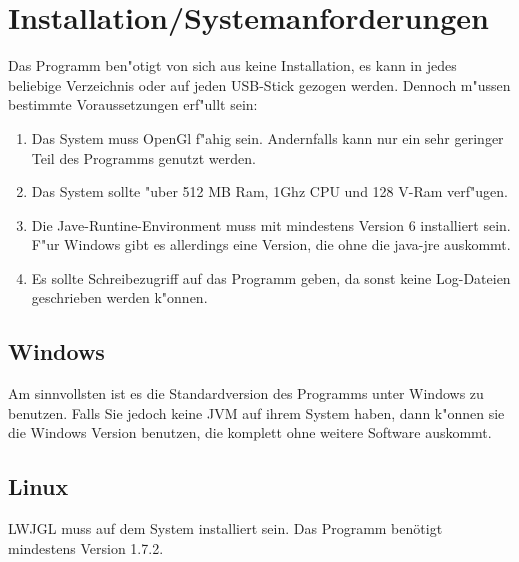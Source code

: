 \documentclass{scrartcl}
\begin{document}
\section {Installation/Systemanforderungen}
Das Programm ben"otigt von sich aus keine Installation, es kann in jedes beliebige Verzeichnis oder auf jeden USB-Stick gezogen werden. Dennoch m"ussen bestimmte Voraussetzungen erf"ullt sein:
\begin{enumerate}
\item Das System muss OpenGl f"ahig sein. Andernfalls kann nur ein sehr geringer Teil des Programms genutzt werden.
\item Das System sollte "uber 512 MB Ram, 1Ghz CPU und 128 V-Ram verf"ugen.
\item Die Jave-Runtine-Environment muss mit mindestens Version 6 installiert sein. F"ur Windows gibt es allerdings eine Version, die ohne die java-jre auskommt.
\item Es sollte Schreibezugriff auf das Programm geben, da sonst keine Log-Dateien geschrieben werden k"onnen.
\end{enumerate}
\subsection{Windows}
Am sinnvollsten ist es die Standardversion des Programms unter Windows zu benutzen. Falls Sie jedoch keine JVM auf ihrem System haben, dann k"onnen sie die Windows Version benutzen, die komplett ohne weitere Software auskommt.
\subsection{Linux}
LWJGL muss auf dem System installiert sein. Das Programm ben\"otigt mindestens Version 1.7.2.
\end{document}
